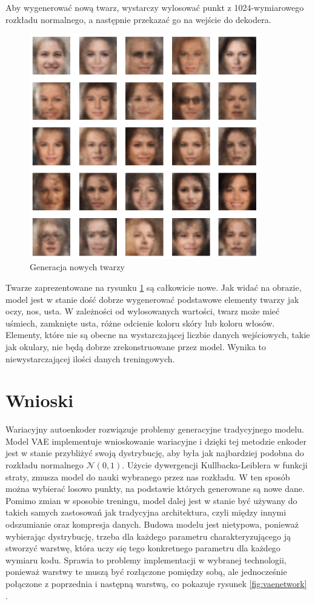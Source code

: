 \documentclass[a4paper,12pt,oneside]{book} %
\begin{document}
Aby wygenerować nową twarz, wystarczy wylosować punkt z 1024-wymiarowego rozkładu normalnego, a następnie przekazać go na wejście do dekodera.
\begin{figure}[h!]
	\centering\includegraphics[width=10cm]{generatedfaces.png}
	\caption{Generacja nowych twarzy}
	\label{fig:facegenvae}
\end{figure}

Twarze zaprezentowane na rysunku \ref{fig:facegenvae} są całkowicie nowe. Jak widać na obrazie, model jest w stanie dość dobrze wygenerować podstawowe elementy twarzy jak oczy, nos, usta. W zależności od wylosowanych wartości, twarz może mieć uśmiech, zamknięte usta, różne odcienie koloru skóry lub koloru włosów. Elementy, które nie są obecne na wystarczającej liczbie danych wejściowych, takie jak okulary, nie będą dobrze zrekonstruowane przez model. Wynika to niewystarczającej ilości danych treningowych.


\newpage
\section{Wnioski}
Wariacyjny autoenkoder rozwiązuje problemy generacyjne tradycyjnego modelu. Model VAE implementuje wnioskowanie wariacyjne i dzięki tej metodzie enkoder jest w stanie przybliżyć swoją dystrybucję, aby była jak najbardziej podobna do rozkładu normalnego $\mathcal{N}(0, 1)$. Użycie dywergencji Kullbacka-Leiblera w funkcji straty, zmusza model do nauki wybranego przez nas rozkładu. W ten sposób można wybierać losowo punkty, na podstawie których generowane są nowe dane. Pomimo zmian w sposobie treningu, model dalej jest w stanie być używany do takich samych zastosowań jak tradycyjna architektura, czyli między innymi odszumianie oraz kompresja danych. Budowa modelu jest nietypowa, ponieważ wybierając dystrybucję, trzeba dla każdego parametru charakteryzującego ją stworzyć warstwę, która uczy się tego konkretnego parametru dla każdego wymiaru kodu. Sprawia to problemy implementacji w wybranej technologii, ponieważ warstwy te muszą być rozłączone pomiędzy sobą, ale jednocześnie połączone z poprzednia i następną warstwą, co pokazuje rysunek \ref{fig:vaenetwork} \cite{tikzvae}. 
\end{document}
